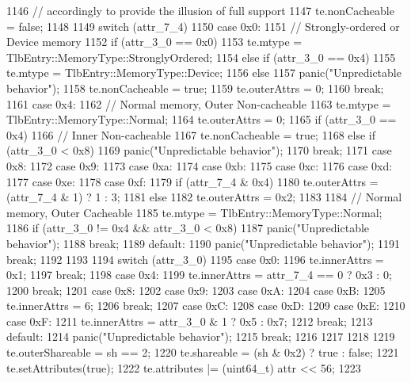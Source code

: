 \begin{DoxyCode}
{{1146         // accordingly to provide the illusion of full support
1147         te.nonCacheable = false;
1148 
1149         switch (attr_7_4) {
1150           case 0x0:
1151             // Strongly-ordered or Device memory
1152             if (attr_3_0 == 0x0)
1153                 te.mtype = TlbEntry::MemoryType::StronglyOrdered;
1154             else if (attr_3_0 == 0x4)
1155                 te.mtype = TlbEntry::MemoryType::Device;
1156             else
1157                 panic("Unpredictable behavior\n");
1158             te.nonCacheable = true;
1159             te.outerAttrs   = 0;
1160             break;
1161           case 0x4:
1162             // Normal memory, Outer Non-cacheable
1163             te.mtype = TlbEntry::MemoryType::Normal;
1164             te.outerAttrs = 0;
1165             if (attr_3_0 == 0x4)
1166                 // Inner Non-cacheable
1167                 te.nonCacheable = true;
1168             else if (attr_3_0 < 0x8)
1169                 panic("Unpredictable behavior\n");
1170             break;
1171           case 0x8:
1172           case 0x9:
1173           case 0xa:
1174           case 0xb:
1175           case 0xc:
1176           case 0xd:
1177           case 0xe:
1178           case 0xf:
1179             if (attr_7_4 & 0x4) {
1180                 te.outerAttrs = (attr_7_4 & 1) ? 1 : 3;
1181             } else {
1182                 te.outerAttrs = 0x2;
1183             }
1184             // Normal memory, Outer Cacheable
1185             te.mtype = TlbEntry::MemoryType::Normal;
1186             if (attr_3_0 != 0x4 && attr_3_0 < 0x8)
1187                 panic("Unpredictable behavior\n");
1188             break;
1189           default:
1190             panic("Unpredictable behavior\n");
1191             break;
1192         }
1193 
1194         switch (attr_3_0) {
1195           case 0x0:
1196             te.innerAttrs = 0x1;
1197             break;
1198           case 0x4:
1199             te.innerAttrs = attr_7_4 == 0 ? 0x3 : 0;
1200             break;
1201           case 0x8:
1202           case 0x9:
1203           case 0xA:
1204           case 0xB:
1205             te.innerAttrs = 6;
1206             break;
1207           case 0xC:
1208           case 0xD:
1209           case 0xE:
1210           case 0xF:
1211             te.innerAttrs = attr_3_0 & 1 ? 0x5 : 0x7;
1212             break;
1213           default:
1214             panic("Unpredictable behavior\n");
1215             break;
1216         }
1217     }
1218 
1219     te.outerShareable = sh == 2;
1220     te.shareable       = (sh & 0x2) ? true : false;
1221     te.setAttributes(true);
1222     te.attributes |= (uint64_t) attr << 56;
1223 }
\end{DoxyCode}
